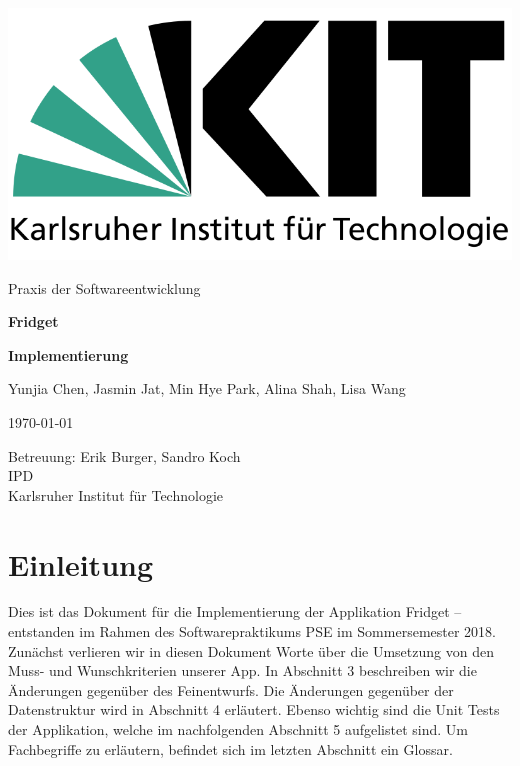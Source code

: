 \documentclass[a4paper]{scrreprt}
\begin{document}
	
	\begin{flushright}
		\includegraphics[scale = 0.2]{kit-logo.png}\\[0.5cm]
	\end{flushright}
	\vspace*{2cm}
	
	\begin{center}
		\large Praxis der Softwareentwicklung
		\vspace*{1.5cm}
		
		\textbf{\huge Fridget}
		\vspace*{1cm}
		
		\textbf{\Large Implementierung}
		\vspace*{2cm}
		
		Yunjia Chen, Jasmin Jat, Min Hye Park, Alina Shah, Lisa Wang
		\vspace*{1cm}
		
		\today
		\vspace*{2.5cm}
		
		Betreuung: Erik Burger, Sandro Koch\\[0.5cm]
		IPD\\[0.5cm]
		
		Karlsruher Institut für Technologie
		
	\end{center}

	\thispagestyle{empty}
	
	\tableofcontents
	
	\chapter{Einleitung}
	Dies ist das Dokument für die Implementierung der Applikation Fridget – entstanden im Rahmen
	des Softwarepraktikums PSE im Sommersemester 2018.
	Zunächst verlieren wir in diesen Dokument Worte über die Umsetzung von den Muss- und Wunschkriterien unserer App.
	In Abschnitt 3 beschreiben wir die Änderungen gegenüber des Feinentwurfs.
	Die Änderungen gegenüber der Datenstruktur wird in Abschnitt 4 erläutert.
	Ebenso wichtig sind die Unit Tests der Applikation, welche im nachfolgenden Abschnitt 5 aufgelistet sind.
	Um Fachbegriffe zu erläutern, befindet sich im letzten Abschnitt ein Glossar.
	
\end{document}
